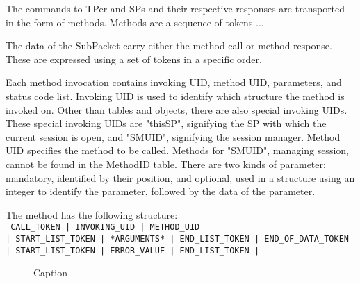 The commands to TPer and SPs and their respective responses are transported in the form of methods. Methods are a sequence of tokens ...

The data of the SubPacket carry either the method call or method response. %
These are expressed using a set of tokens in a specific order.

Each method invocation contains invoking UID, method UID, parameters, and status code list.
Invoking UID is used to identify which structure the method is invoked on. Other than tables and objects, there are also special invoking UIDs. These special invoking UIDs are "thisSP", signifying the SP with which the current session is open, and "SMUID", signifying the session manager. %
Method UID specifies the method to be called. Methods for "SMUID", managing session, cannot be found in the MethodID table.
There are two kinds of parameter: mandatory, identified by their position, and optional, used in a structure using an integer to identify the parameter, followed by the data of the parameter.

The method has the following structure: \\
\verb# CALL_TOKEN | INVOKING_UID | METHOD_UID# \\
\verb#| START_LIST_TOKEN | *ARGUMENTS* | END_LIST_TOKEN | END_OF_DATA_TOKEN# \\
\verb#| START_LIST_TOKEN | ERROR_VALUE | END_LIST_TOKEN | #

\begin{figure}
    \centering
{}    
\caption{Caption}
    \label{fig:my_label}
\end{figure}


